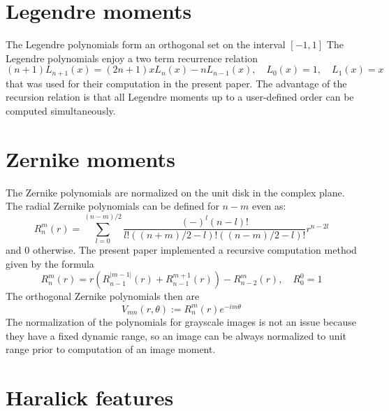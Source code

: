 \documentclass{amsart}
\begin{document}
\section{Legendre moments}\label{sec:legendre}
 	The Legendre polynomials form an orthogonal set on the interval $[-1, 1]$ 
 	The Legendre polynomials enjoy a two term recurrence relation %
 	\begin{equation}
 		(n+1)L_{n+1} (x)=  (2 n + 1) x L_{n} (x) - n L_{n-1}(x) , \quad L_0(x)=1, \quad  L_1(x)= x
 	\end{equation}
 	that was used for their computation in the present paper. 
 	The advantage of the recursion relation is that all Legendre moments up to a user-defined order can be computed simultaneously. 

\section{Zernike moments} \label{sec:zernike}
 	The Zernike polynomials are normalized on the unit disk in the complex plane.
 	The radial  Zernike polynomials   can be defined for $n-m$ even as:
 	\begin{equation}
 		R_{n}^{m} (r) = \sum_{l=0}^{ (n-m)/2 } \frac{(-)^l  (n-l)! }{l! ( (n+m)/2 -l )! ( (n-m)/2 -l)! } r^{n - 2 l}
 	\end{equation}
 	and 0 otherwise.
 	The present paper implemented a  recursive computation method given by the formula \cite{Shakibaei2013}
 	\begin{equation}
 		R^m_n(r)=r \left( R^{|m-1|}_{n-1} (r) +  R^{m+1}_{n-1} (r) \right)  - R^{m}_{n-2} (r), \quad R^0_0=1
 	\end{equation}
 	The orthogonal Zernike polynomials then are
 	\begin{equation}
 		V_{mn}(r, \theta):= R_{n}^{m} (r) e^{-i m \theta}
 	\end{equation}
 	The normalization of the polynomials for grayscale images is not an issue because they have a fixed dynamic range, 
 	so an image can be always normalized to unit range prior to computation of an image moment.  

\section{Haralick features}
\end{document}
